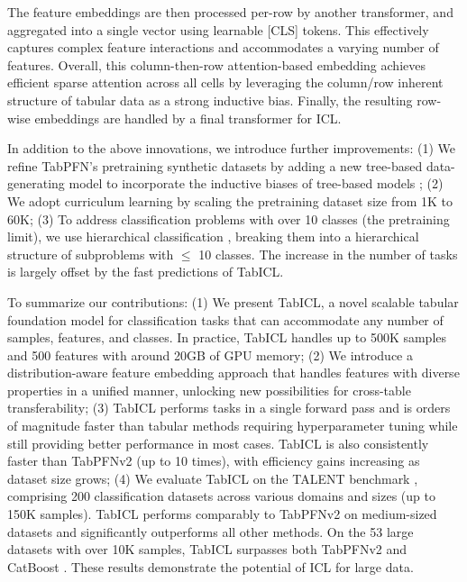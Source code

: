 \documentclass{article}
\theoremstyle{plain}
\theoremstyle{definition}
\theoremstyle{remark}
\begin{document}
The feature embeddings are then processed per-row by another transformer, and aggregated into a single vector using learnable [CLS] tokens. This effectively captures complex feature interactions and accommodates a varying number of features. Overall, this column-then-row attention-based embedding achieves efficient sparse attention across all cells by leveraging the column/row inherent structure of tabular data as a strong inductive bias.
Finally, the resulting row-wise embeddings are handled by a final transformer for ICL.

In addition to the above innovations, we introduce further improvements: (1) We refine TabPFN's pretraining synthetic datasets by adding a new tree-based data-generating model to incorporate the inductive biases of tree-based models \cite{grinsztajnWhyTreebasedModels2022,breejenWhyInContextLearning2024,grinsztajn2024reconcilier}; (2) We adopt curriculum learning by scaling the pretraining dataset size from 1K to 60K; (3) To address classification problems with over 10 classes (the pretraining limit), we use hierarchical classification \cite{sillaSurveyHierarchicalClassification2011}, breaking them into a hierarchical structure of subproblems with $\leq$ 10 classes. The increase in the number of tasks is largely offset by the fast predictions of TabICL.

To summarize our contributions:
(1) We present TabICL, a novel scalable tabular foundation model for classification tasks that can accommodate any number of samples, features, and classes. In practice, TabICL handles up to 500K samples and 500 features with around 20GB of GPU memory;
(2) We introduce a distribution-aware feature embedding approach that handles features with diverse properties in a unified manner, unlocking new possibilities for cross-table transferability;
(3) TabICL performs tasks in a single forward pass and is orders of magnitude faster than tabular methods requiring hyperparameter tuning while still providing better performance in most cases. TabICL is also consistently faster than TabPFNv2 (up to 10 times), with efficiency gains increasing as dataset size grows;
(4) We evaluate TabICL on the TALENT benchmark \cite{yeCloserLookDeep2025a}, comprising 200 classification datasets across various domains and sizes (up to 150K samples). TabICL performs comparably to TabPFNv2 on medium-sized datasets and significantly outperforms all other methods. On the 53 large datasets with over 10K samples, TabICL surpasses both TabPFNv2 and CatBoost \cite{dorogushCatBoostGradientBoosting2018}. These results demonstrate the potential of ICL for large data.
\end{document}
